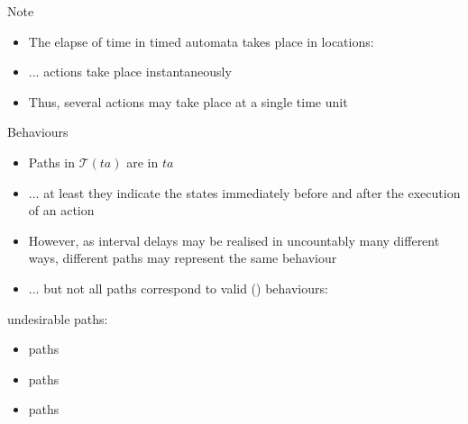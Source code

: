 \documentclass[aspectratio=169]{beamer}
\def\TL#1{\mathcal{T}(#1)}
\begin{document}
\begin{slide}{Note}
\small

\begin{itemize}
\item The elapse of time in timed automata  takes place in locations:
\item ... actions take place instantaneously 
\item Thus, several actions may take place at a single time unit
\end{itemize}
\end{slide}

\begin{slide}{Behaviours}
\small

\begin{itemize}
\item Paths in $\TL{ta}$ are  in $ta$
\item ... at least they indicate the states immediately before and after the execution of an action
\item However, as interval delays may be realised in \alert{uncountably} many different ways, different paths 
may represent the same behaviour
\pause
\item ... but not all paths correspond to valid  () behaviours:
\end{itemize}

\begin{block}{undesirable paths:}
\begin{itemize}
\item  {} paths
\item  {} paths
\item  {} paths
\end{itemize}
\end{block}
\end{slide}
\end{document}
